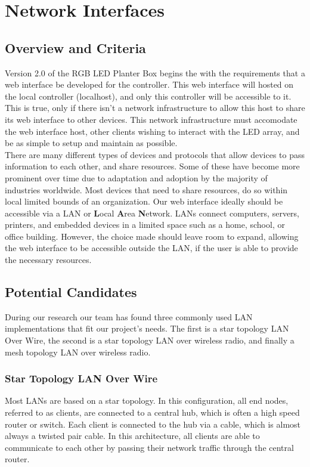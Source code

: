 \section{Network Interfaces}

	\subsection{Overview and Criteria}
	Version 2.0 of the RGB LED Planter Box begins the with the requirements that a web interface be developed for the controller.
	This web interface will hosted on the local controller (localhost), and only this controller will be accessible to it.
	This is true, only if there isn't a network infrastructure to allow this host to share its web interface to other devices.
	This network infrastructure must accomodate the web interface host, other clients wishing to interact with the LED array, and
	be as simple to setup and maintain as possible.  \\

	There are many different types of devices and protocols that allow devices to pass information to each other, and share resources.
	Some of these have become more prominent over time due to adaptation and adoption by the majority of industries worldwide.
	Most devices that need to share resources, do so within local limited bounds of an organization.
	Our web interface ideally should be accessible via a LAN or \textbf{L}ocal \textbf{A}rea \textbf{N}etwork.
	LANs connect computers, servers, printers, and embedded devices in a limited space such as a home, school, or office building. \cite{LAN1}
	However, the choice made should leave room to expand, allowing the web interface to be accessible outside the LAN, if the user is able to provide the necessary resources.

	\subsection{Potential Candidates}
	During our research our team has found three commonly used LAN implementations that fit our project's needs.
	The first is a star topology LAN Over Wire, the second is a star topology LAN over wireless radio, and finally a mesh topology LAN over wireless radio.

	\subsubsection{Star Topology LAN Over Wire}
	Most LANs are based on a star topology.  In this configuration, all end nodes, referred to as clients, are connected to a central hub, which is often a high speed router or switch.
	Each client is connected to the hub via a cable, which is almost always a twisted pair cable.\cite{LAN2}
	In this architecture, all clients are able to communicate to each other by passing their network traffic through the central router.

